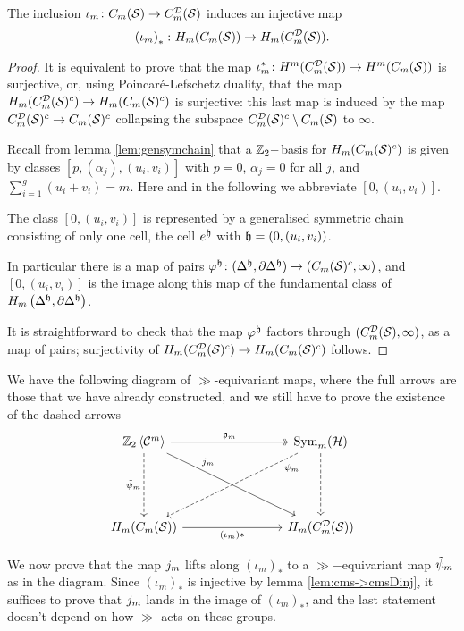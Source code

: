\begin{lem}
 \label{lem:cms->cmsDinj}
 The inclusion $\iota_m\colon C_m(\mathcal{S})\to C_{m}^{\mathcal{D}}(\mathcal{S})$ induces an injective map
 \[
  \left(\iota_m\right)_*\colon H_m(C_m(\mathcal{S}))\to H_m(C_{m}^{\mathcal{D}}(\mathcal{S})).
 \]
\end{lem}
\begin{proof}
 It is equivalent to prove that the map $\iota_m^*\colon H^m(C_{m}^{\mathcal{D}}(\mathcal{S}))\to H^m(C_m(\mathcal{S}))$ is surjective,
 or, using Poincaré-Lefschetz duality, that the map $H_m(C_{m}^{\mathcal{D}}(\mathcal{S})^c)\to H_m(C_m(\mathcal{S})^c)$
 is surjective: this last map is induced by the map $C_{m}^{\mathcal{D}}(\mathcal{S})^c\to C_m(\mathcal{S})^c$ collapsing the subspace
 $C_{m}^{\mathcal{D}}(\mathcal{S})^c\setminus C_m(\mathcal{S})$ to $\infty$.
 
 Recall from lemma \ref{lem:gensymchain} that a $\mathbb{Z}_2-$basis for $H_m(C_m(\mathcal{S})^c)$
 is given by classes $[p,(\alpha_j),(u_i,v_i)]$ with $p=0$, $\alpha_j=0$ for all $j$,
 and $\sum_{i=1}^g (u_i+v_i)=m$. Here and in the following we abbreviate $[0,(u_i,v_i)]$.
 
 The class $[0,(u_i,v_i)]$ is represented by a generalised symmetric chain consisting of only one cell,
 the cell $e^{\mathfrak{h}}$
 with $\mathfrak{h}=(0,(u_i,v_i))$.
 
 In particular there is a map of pairs
 $\varphi^{\mathfrak{h}}\colon(\Delta^{\mathfrak{h}},\partial\Delta^{\mathfrak{h}})\to (C_m(\mathcal{S})^c,\infty)$, and $[0,(u_i,v_i)]$
 is the image along this map of the fundamental class of $H_m\left(\Delta^{\mathfrak{h}},\partial\Delta^{\mathfrak{h}}\right)$.
 
 It is straightforward to check that the map $\varphi^{\mathfrak{h}}$ factors through
 $(C_{m}^{\mathcal{D}}(\mathcal{S}),\infty)$, as a map of pairs; surjectivity of $H_m(C_{m}^{\mathcal{D}}(\mathcal{S})^c)\to H_m(C_m(\mathcal{S})^c)$ follows.
\end{proof}

We have the following diagram of $\gg$-equivariant maps, where the full arrows are those
that we have already constructed, and we still have to prove the existence of the dashed arrows
\begin{equation}
\label{eq:fulldasheddiagram}
\begin{tikzcd}[column sep=8em,row sep=5em]
  \ZcC{m} \ar[r,"\pr_m",two heads]\ar[d,dashed, swap, "\tpsi_m"]\ar[dr,"\j_m",near start]
  & \Sym_m(\H)\ar[d,dashed ]\ar[dl,dashed,very near start,"\psi_m"]\\
  H_m(\cms)\ar[r,swap,"\pa{\iota_m}*"hook] & H_m(\cmsD)
 \end{tikzcd}
\end{equation}

We now prove that the map $j_m$ lifts along $(\iota_m)_*$
to a $\gg-$equivariant map $\tilde\psi_m$ as in the diagram.
Since $(\iota_m)_*$ is injective by lemma \ref{lem:cms->cmsDinj}, it suffices to prove that $j_m$
lands in the image of $(\iota_m)_*$, and the last statement doesn't depend on how $\gg$ acts on these groups.

